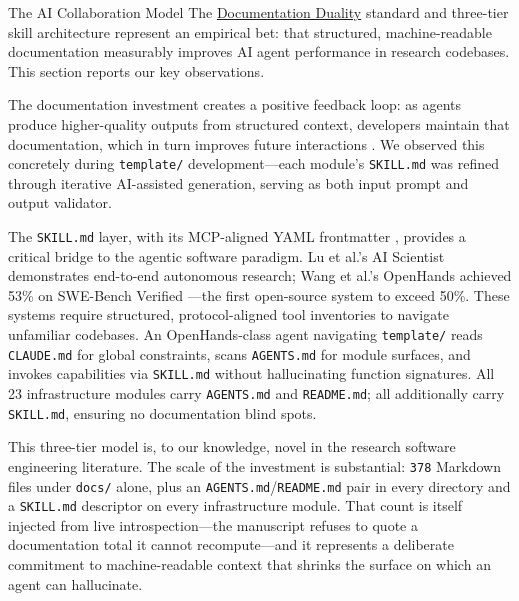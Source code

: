 \documentclass[
  ignorenonframetext,
]{beamer}
\author{\texorpdfstring{}{}}
\date{}
\begin{document}
\begin{frame}{The AI Collaboration Model}
\protect{}\label{the-ai-collaboration-model}
The
\href{03c_documentation.md\#documentation-duality-and-ai-collaboration}{Documentation
Duality} standard and three-tier skill architecture represent an
empirical bet: that structured, machine-readable documentation
measurably improves AI agent performance in research codebases. This
section reports our key observations.

The documentation investment creates a positive feedback loop: as agents
produce higher-quality outputs from structured context, developers
maintain that documentation, which in turn improves future interactions
. We observed this concretely during
\texttt{template/} development---each module's \texttt{SKILL.md} was
refined through iterative AI-assisted generation, serving as both input
prompt and output validator.

The \texttt{SKILL.md} layer, with its MCP-aligned YAML frontmatter
, provides a critical bridge to the agentic
software paradigm. Lu et al.'s AI Scientist \breakseq{[@lu2024aiscientist]}
demonstrates end-to-end autonomous research; Wang et al.'s OpenHands
 achieved 53\% on SWE-Bench Verified
---the first open-source system to exceed
50\%. These systems require structured, protocol-aligned tool
inventories to navigate unfamiliar codebases. An OpenHands-class agent
navigating \texttt{template/} reads \texttt{CLAUDE.md} for global
constraints, scans \texttt{AGENTS.md} for module surfaces, and invokes
capabilities via \texttt{SKILL.md} without hallucinating function
signatures. All 23 infrastructure modules carry \texttt{AGENTS.md} and
\texttt{README.md}; all additionally carry \texttt{SKILL.md}, ensuring
no documentation blind spots.

This three-tier model is, to our knowledge, novel in the research
software engineering literature. The scale of the investment is
substantial: \texttt{378} Markdown files under \texttt{docs/} alone,
plus an \texttt{AGENTS.md}/\texttt{README.md} pair in every directory
and a \texttt{SKILL.md} descriptor on every infrastructure module. That
count is itself injected from live introspection---the manuscript
refuses to quote a documentation total it cannot recompute---and it
represents a deliberate commitment to machine-readable context that
shrinks the surface on which an agent can hallucinate.
\end{frame}
\end{document}
